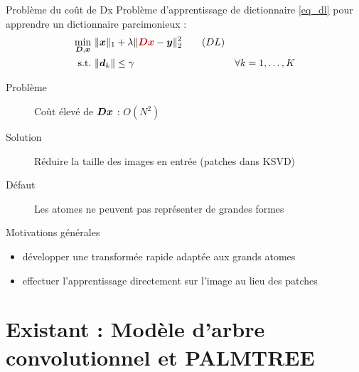 \begin{frame}{Problème du coût de Dx}
Problème d'apprentissage de dictionnaire \eqref{eq_dl} pour apprendre un dictionnaire parcimonieux :
\begin{align} 
\underset{\D,\x}{\min}~ & \| \x \|_1 + \lambda \| \Req{\D\x}-\y \|^2_2 \tag{$DL$}\label{eq_dl} \\
\text{s.t.}~ & \| \d_k \| \le \gamma & \forall k = 1,\dots,K\label{eq_dl_finite_norm} \notag
\end{align}
\begin{description}
	\item[Problème] Coût élevé de $\bm{D}\bm{x}$ : \alert{$O(N^2)$}
	\item[Solution] Réduire la taille des images en entrée (patches dans KSVD)
	\item[Défaut] Les atomes ne peuvent pas représenter de grandes formes
\end{description}
\end{frame}


\begin{frame}{Motivations générales}
	\begin{itemize}
		\item développer une \alert{transformée rapide} adaptée aux grands atomes
		\item effectuer l'apprentissage \alert{directement sur l'image} au lieu des patches
	\end{itemize}
\end{frame}


\section{Existant : Modèle d'arbre convolutionnel et PALMTREE}

